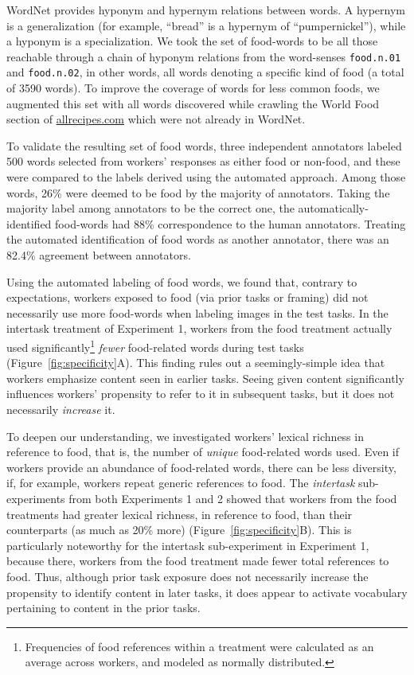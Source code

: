 \documentclass{sigchi}
\begin{document}
WordNet provides
hyponym and hypernym relations between words.  A hypernym is a 
generalization (for example, ``bread'' is a hypernym of ``pumpernickel''), 
while a hyponym is a specialization.  We took the set of food-words
to be all those reachable through
a chain of hyponym relations from the word-senses 
\texttt{food.n.01} and \texttt{food.n.02}, in other words, all words
denoting a specific kind of food (a total of 3590 words).  
To improve the coverage of words for
less common foods, we augmented this set with all words
discovered while crawling the World Food section of \url{allrecipes.com} 
which were not already in WordNet.  

To validate the resulting set of 
food words, three independent annotators labeled 500 words selected from 
workers' responses as either food or non-food, and these were
compared to the labels derived using the automated approach.
Among those words, 26\% were 
deemed to be food by the majority of annotators.  
Taking the majority label among annotators to be the correct one, 
the automatically-identified food-words
had 88\% correspondence to the human annotators.  Treating the
automated identification of food words as another annotator, there 
was an 82.4\% agreement between annotators.

Using the automated labeling of food words, we found that, contrary to
expectations,
workers exposed to food (via prior tasks or framing) did not necessarily
use more food-words when labeling images in the test tasks.
In the intertask treatment of Experiment 1, workers from the food treatment
actually used significantly\footnote{
  Frequencies of food references within a treatment were calculated as
  an average across workers, and modeled as normally distributed.
} \textit{fewer} food-related words 
during test tasks (Figure~\ref{fig:specificity}A).  This finding
rules out a seemingly-simple idea that workers emphasize
content seen in earlier tasks.  Seeing given content significantly 
influences workers' propensity to refer to it in subsequent tasks, but it 
does not necessarily \textit{increase} it.

To deepen our understanding, we investigated workers' lexical richness in 
reference to food, that is, the number of \textit{unique} food-related 
words used.  Even if workers provide an abundance of food-related words, 
there can be less diversity, if, for example, workers repeat generic 
references to food.
The \textit{intertask} sub-experiments from both Experiments 1 and 2 showed
that workers from the food treatments had
greater lexical richness, in reference to food, than their counterparts 
(as much as 20\% more) (Figure~\ref{fig:specificity}B).  
This is particularly noteworthy for the intertask sub-experiment in 
Experiment 1, because there,
workers from the food treatment made fewer total references to food.  
Thus, although prior task exposure does not necessarily increase the 
propensity
to identify content in later tasks, it does appear to activate vocabulary 
pertaining to content in the prior tasks.
\end{document}
